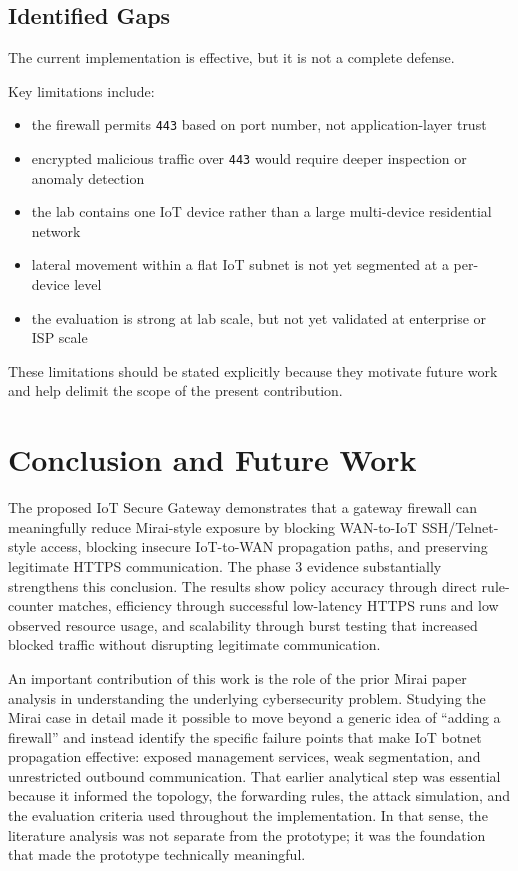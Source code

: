 \documentclass[journal]{IEEEtran}
\begin{document}
\subsection{Identified Gaps}
The current implementation is effective, but it is not a complete defense.

Key limitations include:
\begin{itemize}
\item the firewall permits \texttt{443} based on port number, not application-layer trust
\item encrypted malicious traffic over \texttt{443} would require deeper inspection or anomaly detection
\item the lab contains one IoT device rather than a large multi-device residential network
\item lateral movement within a flat IoT subnet is not yet segmented at a per-device level
\item the evaluation is strong at lab scale, but not yet validated at enterprise or ISP scale
\end{itemize}

These limitations should be stated explicitly because they motivate future work and help delimit the scope of the present contribution.

\section{Conclusion and Future Work}
The proposed IoT Secure Gateway demonstrates that a gateway firewall can meaningfully reduce Mirai-style exposure by blocking WAN-to-IoT SSH/Telnet-style access, blocking insecure IoT-to-WAN propagation paths, and preserving legitimate HTTPS communication. The phase 3 evidence substantially strengthens this conclusion. The results show policy accuracy through direct rule-counter matches, efficiency through successful low-latency HTTPS runs and low observed resource usage, and scalability through burst testing that increased blocked traffic without disrupting legitimate communication.

An important contribution of this work is the role of the prior Mirai paper analysis in understanding the underlying cybersecurity problem. Studying the Mirai case in detail made it possible to move beyond a generic idea of ``adding a firewall'' and instead identify the specific failure points that make IoT botnet propagation effective: exposed management services, weak segmentation, and unrestricted outbound communication. That earlier analytical step was essential because it informed the topology, the forwarding rules, the attack simulation, and the evaluation criteria used throughout the implementation. In that sense, the literature analysis was not separate from the prototype; it was the foundation that made the prototype technically meaningful.
\end{document}
